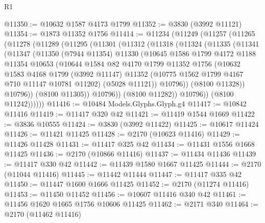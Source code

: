 \begin{lexlean}{R1}
\begin{coremodule}
@11350 := @10632 @1587 @4173 @1799
@11352 := @3830 (@3992 @11121)
@11354 := @1873 @11352 @1756
@11414 := @11234
    (@11249
      (@11257
        (@11265
          (@11278
            (@11289
              (@11295
                (@11301
                  (@11312
                    (@11318
                      (@11324
                        (@11335
                          (@11341
                            (@11347
                              (@11350
                                (@7944 @11354)
                                @11330
                                (@10645
                                  @1586
                                  @1799
                                  @4172
                                  @1188
                                  @11354
                                  @10653
                                  (@10644
                                    @1584
                                    @82
                                    @4170
                                    @1799
                                    @11352
                                    @1756
                                    (@10632
                                      @1583
                                      @4168
                                      @1799
                                      (@3992 @11147)
                                      @11352
                                      (@10775 @1562 @1799 @4167 @710 @11147 @10781 @11202)
                                      (@5028 @11121))
                                    @10796))
                                (@8100 @11328))
                              @10796))
                          (@8100 @11305))
                        @10796))
                    (@8100 @11282))
                  @10796))
              (@8100 @11242))))))
@11416 := @10484 Models.Glyphs.Glyph.g4
@11417 := @10842 @11416
@11419 := @11417 @320 @42
@11421 := @11419 @1544 @1669
@11422 := @3836 @10555
@11424 := @3830 (@3992 @11422)
@11425 := @10617 @11424
@11426 := @11421 @11425
@11428 := @2170 (@10623 @11416)
@11429 := @11426 @11428
@11431 := @11417 @325 @42
@11434 := @11431 @1556 @1668 @11425
@11436 := @2170 (@10866 @11416)
@11437 := @11434 @11436
@11439 := @11417 @330 @42
@11442 := @11439 @1580 @1667 @11425
@11444 := @2170 (@11044 @11416)
@11445 := @11442 @11444
@11447 := @11417 @335 @42
@11450 := @11447 @1600 @1666 @11425
@11452 := @2170 (@11274 @11416)
@11453 := @11450 @11452
@11456 := @10607 @11416 @340 @42
@11461 := @11456 @1620 @1665 @1756 @10606 @11425
@11462 := @2171 @340
@11464 := @2170 (@11462 @11416)

\end{coremodule}
\end{lexlean}
